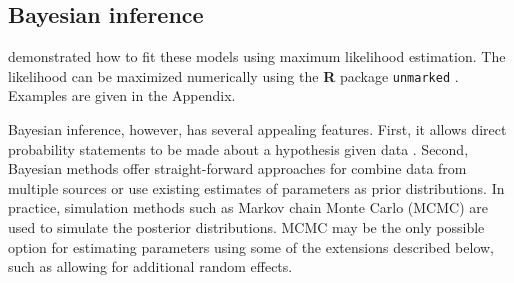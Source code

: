 \documentclass[12pt]{article}
\begin{document}




\subsection{Bayesian inference}

\citet{dail_madsen:2011} demonstrated how to fit these models using maximum 
likelihood estimation. The likelihood can be maximized numerically using the
\textbf{R} package \texttt{unmarked} \citep{fiske_chandler:2011}. Examples
are given in the Appendix.

Bayesian inference, however, has several appealing features. First, it
allows direct probability statements to be made about a hypothesis
given data \citep{link_barker:2010}.    
Second, Bayesian methods offer straight-forward approaches for
combine data from multiple sources or use existing estimates of parameters as prior
distributions. In practice, simulation methods such as Markov
chain Monte Carlo (MCMC) are used to simulate the posterior
distributions. %
MCMC may be the only possible option for estimating parameters
using some of the extensions described below, such as allowing for
additional random effects.
\end{document}
